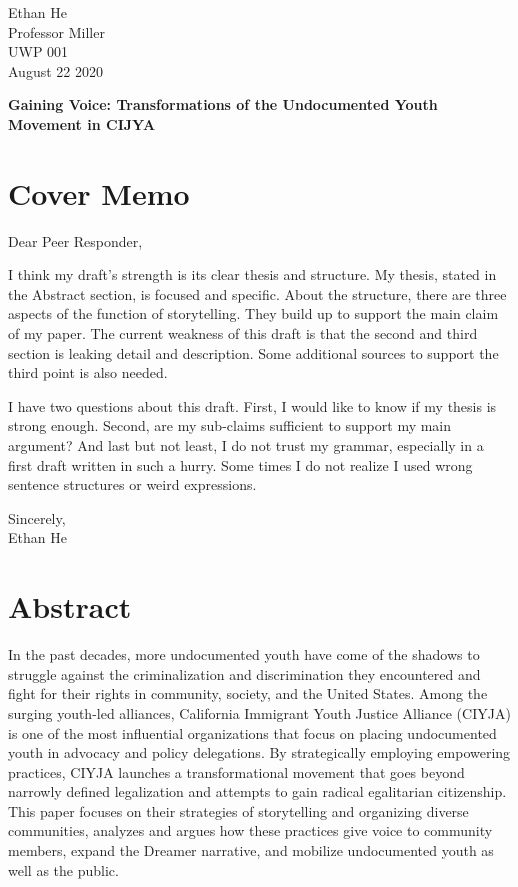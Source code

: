 \documentclass[12pt]{article}
\begin{document}
\begin{flushleft}

Ethan He \\
Professor Miller \\
UWP 001 \\
August 22 2020 \\

\begin{center}
    \textbf{Gaining Voice: Transformations of the Undocumented Youth Movement in CIJYA}
\end{center}

\setlength{\parindent}{0.5in}

\section*{Cover Memo}

\noindent
Dear Peer Responder,

I think my draft's strength is its clear thesis and structure.
My thesis, stated in the Abstract section, is focused and specific.
About the structure, there are three aspects of the function of storytelling.
They build up to support the main claim of my paper.
The current weakness of this draft is that the second and third section is leaking detail and description.
Some additional sources to support the third point is also needed.

I have two questions about this draft.
First, I would like to know if my thesis is strong enough.
Second, are my sub-claims sufficient to support my main argument?
And last but not least,  I do not trust my grammar, especially in a first draft written in such a hurry.
Some times I do not realize I used wrong sentence structures or weird expressions.

\noindent
Sincerely, \\
\noindent
Ethan He

\section{Abstract}

In the past decades, more undocumented youth have come of the shadows to struggle against the criminalization and discrimination they encountered and fight for their rights in community, society, and the United States. 
Among the surging youth-led alliances, California Immigrant Youth Justice Alliance (CIYJA) is one of the most influential organizations that focus on placing undocumented youth in advocacy and policy delegations. 
By strategically employing empowering practices, CIYJA launches a transformational movement that goes beyond narrowly defined legalization and attempts to gain radical egalitarian citizenship.
This paper focuses on their strategies of storytelling and organizing diverse communities, analyzes and argues how these practices give voice to community members, expand the Dreamer narrative, and mobilize undocumented youth as well as the public.


\end{flushleft}
\end{document}
